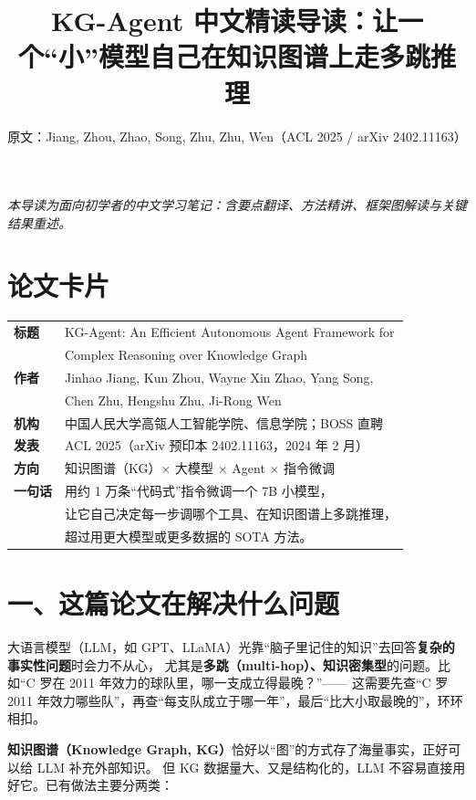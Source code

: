 \documentclass[11pt,UTF8,fontset=fandol]{ctexart}
\title{KG-Agent 中文精读导读：让一个“小”模型自己在知识图谱上走多跳推理}
\author{原文：Jiang, Zhou, Zhao, Song, Zhu, Zhu, Wen（ACL 2025 / arXiv 2402.11163）}
\date{}
\begin{document}
\maketitle
\begin{center}\small\textit{本导读为面向初学者的中文学习笔记：含要点翻译、方法精讲、框架图解读与关键结果重述。}\end{center}

\section*{论文卡片}
\begin{center}
\begin{tabular}{@{}ll@{}}
\toprule
\textbf{标题} & KG-Agent: An Efficient Autonomous Agent Framework for \\
            & Complex Reasoning over Knowledge Graph \\
\textbf{作者} & Jinhao Jiang, Kun Zhou, Wayne Xin Zhao, Yang Song, \\
            & Chen Zhu, Hengshu Zhu, Ji-Rong Wen \\
\textbf{机构} & 中国人民大学高瓴人工智能学院、信息学院；BOSS 直聘 \\
\textbf{发表} & ACL 2025（arXiv 预印本 2402.11163，2024 年 2 月） \\
\textbf{方向} & 知识图谱（KG）$\times$ 大模型 $\times$ Agent $\times$ 指令微调 \\
\textbf{一句话} & 用约 1 万条“代码式”指令微调一个 7B 小模型，\\
              & 让它自己决定每一步调哪个工具、在知识图谱上多跳推理，\\
              & 超过用更大模型或更多数据的 SOTA 方法。 \\
\bottomrule
\end{tabular}
\end{center}

\section{一、这篇论文在解决什么问题}

大语言模型（LLM，如 GPT、LLaMA）光靠“脑子里记住的知识”去回答\textbf{复杂的事实性问题}时会力不从心，
尤其是\textbf{多跳（multi-hop）、知识密集型}的问题。比如“C 罗在 2011 年效力的球队里，哪一支成立得最晚？”——
这需要先查“C 罗 2011 年效力哪些队”，再查“每支队成立于哪一年”，最后“比大小取最晚的”，环环相扣。

\textbf{知识图谱（Knowledge Graph, KG）}恰好以“图”的方式存了海量事实，正好可以给 LLM 补充外部知识。
但 KG 数据量大、又是结构化的，LLM 不容易直接用好它。已有做法主要分两类：
\end{document}
